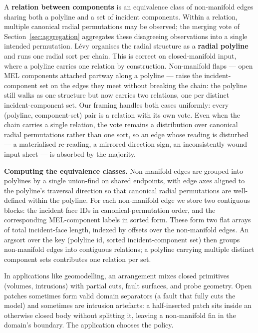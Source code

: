 \documentclass{egpubl}
\begin{document}
A \textbf{relation between components} is an equivalence class of non-manifold edges sharing both a polyline and a set of incident components. Within a relation, multiple canonical radial permutations may be observed; the merging vote of Section~\ref{sec:aggregation} aggregates these disagreeing observations into a single intended permutation. L\'evy organises the radial structure as a \textbf{radial polyline} \cite{Levy2025} and runs one radial sort per chain. This is correct on closed-manifold input, where a polyline carries one relation by construction. Non-manifold flaps --- open MEL components attached partway along a polyline --- raise the incident-component set on the edges they meet without breaking the chain: the polyline still walks as one structure but now carries two relations, one per distinct incident-component set. Our framing handles both cases uniformly: every (polyline, component-set) pair is a relation with its own vote. Even when the chain carries a single relation, the vote remains a distribution over canonical radial permutations rather than one sort, so an edge whose reading is disturbed --- a materialised re-reading, a mirrored direction sign, an inconsistently wound input sheet --- is absorbed by the majority.

\textbf{Computing the equivalence classes.} Non-manifold edges are grouped into polylines by a single union-find on shared endpoints, with edge axes aligned to the polyline's traversal direction so that canonical radial permutations are well-defined within the polyline. For each non-manifold edge we store two contiguous blocks: the incident face IDs in canonical-permutation order, and the corresponding MEL-component labels in sorted form. These form two flat arrays of total incident-face length, indexed by offsets over the non-manifold edges. An argsort over the key (polyline id, sorted incident-component set) then groups non-manifold edges into contiguous relations; a polyline carrying multiple distinct component sets contributes one relation per set.

In applications like geomodelling, an arrangement mixes closed primitives (volumes, intrusions) with partial cuts, fault surfaces, and probe geometry. Open patches sometimes form valid domain separators (a fault that fully cuts the model) and sometimes are intrusion artefacts: a half-inserted patch sits inside an otherwise closed body without splitting it, leaving a non-manifold fin in the domain's boundary. The application chooses the policy.
\end{document}
